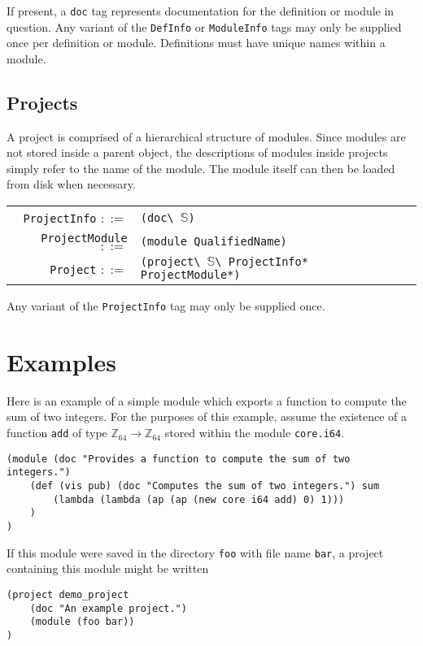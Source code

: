 \documentclass[UKenglish, 11pt, a4paper, parskip=half]{scrbook}
\newcommand{\inlinecode}[1]{\lstinline{#1}}
\begin{document}
If present, a \inlinecode{doc} tag represents documentation for the definition or module in question.
Any variant of the \inlinecode{DefInfo} or \inlinecode{ModuleInfo} tags may only be supplied once per definition or module.
Definitions must have unique names within a module.

\subsection{Projects}

A project is comprised of a hierarchical structure of modules.
Since modules are not stored inside a parent object, the descriptions of modules inside projects simply refer to the name of the module.
The module itself can then be loaded from disk when necessary.

\begin{tabular}{r l p{7cm}}
    \inlinecode{ProjectInfo} \( ::= \) & \inlinecode{(doc\ }\( \mathbb S \)\inlinecode{)} \\
    \inlinecode{ProjectModule} \( ::= \) & \inlinecode{(module QualifiedName)} \\
    \inlinecode{Project} \( ::= \) & \inlinecode{(project\ }\( \mathbb S \)\inlinecode{\ ProjectInfo* ProjectModule*)} \\
\end{tabular}

Any variant of the \inlinecode{ProjectInfo} tag may only be supplied once.

\section{Examples}
Here is an example of a simple module which exports a function to compute the sum of two integers.
For the purposes of this example, assume the existence of a function \inlinecode{add} of type \( \mathbb Z_{64} \to \mathbb Z_{64} \) stored within the module \inlinecode{core.i64}.
\begin{lstlisting}
(module (doc "Provides a function to compute the sum of two integers.")
    (def (vis pub) (doc "Computes the sum of two integers.") sum
        (lambda (lambda (ap (ap (new core i64 add) 0) 1)))
    )
)
\end{lstlisting}
If this module were saved in the directory \inlinecode{foo} with file name \inlinecode{bar}, a project containing this module might be written
\begin{lstlisting}
(project demo_project
    (doc "An example project.")
    (module (foo bar))
)
\end{lstlisting}
\end{document}

